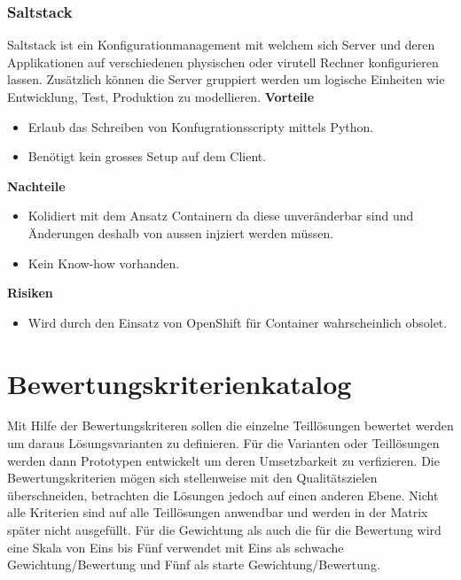 \subsubsection{Saltstack}

Saltstack ist ein Konfigurationmanagement mit welchem sich Server und deren Applikationen auf verschiedenen physischen oder virutell Rechner konfigurieren lassen. Zusätzlich können die Server gruppiert werden um logische Einheiten wie Entwicklung, Test, Produktion zu modellieren.\newline
\newline
\textbf{Vorteile}
\begin{itemize}
	\item Erlaub das Schreiben von Konfugrationsscripty mittels Python.
	\item Benötigt kein grosses Setup auf dem Client.
\end{itemize}
\textbf{Nachteile}
\begin{itemize}
	\item Kolidiert mit dem Ansatz Containern da diese unveränderbar sind und Änderungen deshalb von aussen injziert werden müssen.
	\item Kein Know-how vorhanden.
\end{itemize}
\textbf{Risiken}
\begin{itemize}
	\item Wird durch den Einsatz von OpenShift für Container wahrscheinlich obsolet.
\end{itemize}

\section{Bewertungskriterienkatalog}

Mit Hilfe der Bewertungskriteren sollen die einzelne Teillösungen bewertet werden um daraus Lösungsvarianten zu definieren. Für die Varianten oder Teillösungen werden dann Prototypen entwickelt um deren Umsetzbarkeit zu verfizieren. Die Bewertungskriterien mögen sich stellenweise mit den Qualitätszielen überschneiden, betrachten die Lösungen jedoch auf einen anderen Ebene. Nicht alle Kriterien sind auf alle Teillösungen anwendbar und werden in der Matrix später nicht ausgefüllt.\newline
Für die Gewichtung als auch die für die Bewertung wird eine Skala von Eins bis Fünf verwendet mit Eins als schwache Gewichtung/Bewertung und Fünf als starte Gewichtung/Bewertung.


